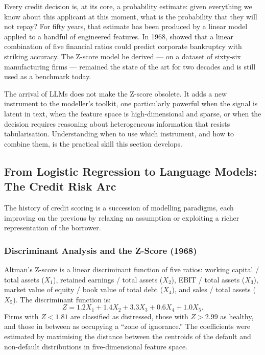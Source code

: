 \begin{context}

Every credit decision is, at its core, a probability estimate: given everything we know about this applicant at this moment, what is the probability that they will not repay? For fifty years, that estimate has been produced by a linear model applied to a handful of engineered features. In 1968, \citet{altman1968financial} showed that a linear combination of five financial ratios could predict corporate bankruptcy with striking accuracy. The Z-score model he derived --- on a dataset of sixty-six manufacturing firms --- remained the state of the art for two decades and is still used as a benchmark today.

The arrival of LLMs does not make the Z-score obsolete. It adds a new instrument to the modeller's toolkit, one particularly powerful when the signal is latent in text, when the feature space is high-dimensional and sparse, or when the decision requires reasoning about heterogeneous information that resists tabularisation. Understanding when to use which instrument, and how to combine them, is the practical skill this section develops.

\subsection{From Logistic Regression to Language Models: The Credit Risk Arc}
\label{subsec:credit-arc}

The history of credit scoring is a succession of modelling paradigms, each improving on the previous by relaxing an assumption or exploiting a richer representation of the borrower.

\subsubsection*{Discriminant Analysis and the Z-Score (1968)}

Altman's Z-score \cite{altman1968financial} is a linear discriminant function of five ratios: working capital / total assets ($X_1$), retained earnings / total assets ($X_2$), EBIT / total assets ($X_3$), market value of equity / book value of total debt ($X_4$), and sales / total assets ($X_5$). The discriminant function is:
\begin{equation}
  Z = 1.2 X_1 + 1.4 X_2 + 3.3 X_3 + 0.6 X_4 + 1.0 X_5.
  \label{eq:zscore}
\end{equation}
Firms with $Z < 1.81$ are classified as distressed, those with $Z > 2.99$ as healthy, and those in between as occupying a ``zone of ignorance.'' The coefficients were estimated by maximising the distance between the centroids of the default and non-default distributions in five-dimensional feature space.


\end{context}
